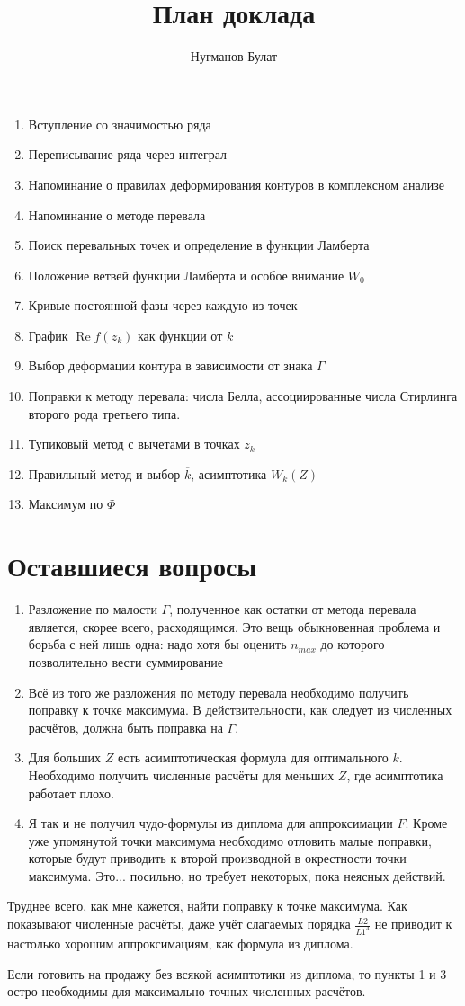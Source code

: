 \documentclass[a4paper, 12pt]{article}
\author{Нугманов Булат}
\title{План доклада}
\DeclareMathOperator*{\Real}{Re}
\begin{document}
\maketitle
\begin{enumerate}
    \item Вступление со значимостью ряда
    \item Переписывание ряда через интеграл
    \item Напоминание о правилах деформирования контуров в комплексном анализе
    \item Напоминание о методе перевала
    \item Поиск перевальных точек и определение в функции Ламберта
    \item Положение ветвей функции Ламберта и особое внимание $W_0$
    \item Кривые постоянной фазы через каждую из точек
    \item График $\Real f(z_k)$ как функции от $k$
    \item Выбор деформации контура в зависимости от знака $\Gamma$
    \item Поправки к методу перевала: числа Белла, ассоциированные числа Стирлинга второго рода третьего типа.
    \item Тупиковый метод с вычетами в точках $z_k$
    \item Правильный метод и выбор $\overline{k}$, асимптотика $W_k(Z)$
    \item Максимум по $\Phi$
\end{enumerate}
\section*{Оставшиеся вопросы}
\begin{enumerate}
    \item Разложение по малости $\Gamma$, полученное как остатки от метода перевала является, скорее всего, расходящимся. Это вещь обыкновенная проблема и борьба с ней лишь одна: надо хотя бы оценить $n_{max}$ до которого позволительно вести суммирование
    \item Всё из того же разложения по методу перевала необходимо получить поправку к точке максимума. В действительности, как следует из численных расчётов, должна быть поправка на $\Gamma$.
    \item Для больших $Z$ есть асимптотическая формула для оптимального $\bar k$. Необходимо получить численные расчёты для меньших $Z$, где асимптотика работает плохо.
    \item Я так и не получил чудо-формулы из диплома для аппроксимации $F$. Кроме уже упомянутой точки максимума необходимо отловить малые поправки, которые будут приводить к второй производной в окрестности точки максимума. Это... посильно, но требует некоторых, пока неясных действий.
\end{enumerate}

Труднее всего, как мне кажется, найти поправку к точке максимума. Как показывают численные расчёты, даже учёт слагаемых порядка $\frac{L2}{L1^4}$ не приводит к настолько хорошим аппроксимациям, как формула из диплома.

Если готовить на продажу без всякой асимптотики из диплома, то пункты 1 и 3 остро необходимы для максимально точных численных расчётов.
\end{document}

